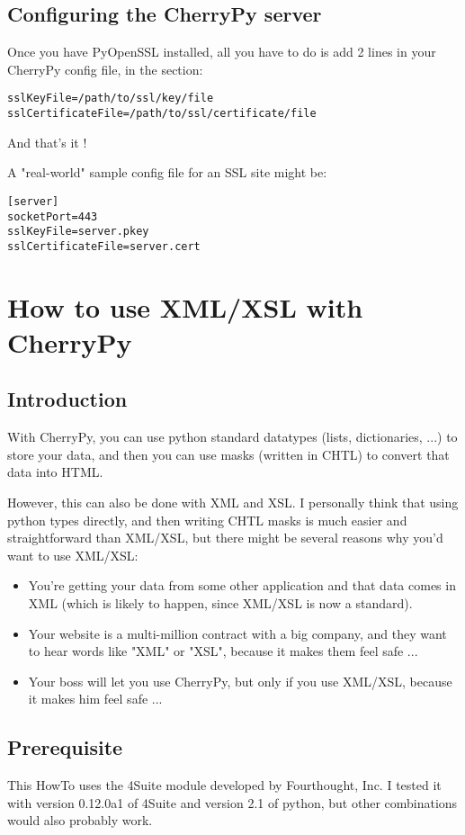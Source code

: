 \documentclass{manual}
\begin{document}
\section{Configuring the CherryPy server}
Once you have PyOpenSSL installed, all you have to do is add 2 lines in your CherryPy config file, in the  section:
\begin{verbatim}
sslKeyFile=/path/to/ssl/key/file
sslCertificateFile=/path/to/ssl/certificate/file
\end{verbatim}

And that's it !

A "real-world" sample config file for an SSL site might be:
\begin{verbatim}
[server]
socketPort=443
sslKeyFile=server.pkey
sslCertificateFile=server.cert
\end{verbatim}

\chapter{How to use XML/XSL with CherryPy}

\section{Introduction}
With CherryPy, you can use python standard datatypes (lists, dictionaries, ...) to store your data, and then you can use
masks (written in CHTL) to convert that data into HTML.

However, this can also be done with XML and XSL. I personally think that using python types directly, and then writing
CHTL masks is much easier and straightforward than XML/XSL, but there might be several reasons why you'd want to use XML/XSL:
\begin{itemize}
\item
You're getting your data from some other application and that data comes in XML (which is likely to
happen, since XML/XSL is now a standard).
\item
Your website is a multi-million contract with a big company, and they want to hear words like "XML" or "XSL", because
it makes them feel safe ...
\item
Your boss will let you use CherryPy, but only if you use XML/XSL, because it makes him feel safe ...
\end{itemize}

\section{Prerequisite}
This HowTo uses the 4Suite module developed by Fourthought, Inc. I tested it with version 0.12.0a1 of 4Suite and version
2.1 of python, but other combinations would also probably work.
\end{document}
